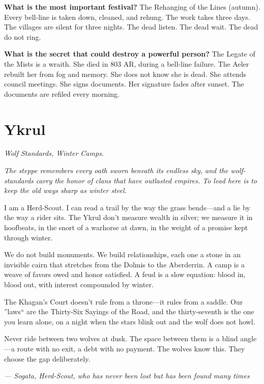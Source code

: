 \begin{almanac}
\textbf{What is the most important festival?} The Rehanging of the Lines (autumn). Every bell-line is taken down, cleaned, and rehung. The work takes three days. The villages are silent for three nights. The dead listen. The dead wait. The dead do not ring.

\textbf{What is the secret that could destroy a powerful person?} The Legate of the Mists is a wraith. She died in 803 AR, during a bell-line failure. The Aeler rebuilt her from fog and memory. She does not know she is dead. She attends council meetings. She signs documents. Her signature fades after sunset. The documents are refiled every morning.
\end{almanac}

\newpage

\newpage

\chapter{Ykrul}
\emph{Wolf Standards, Winter Camps.}

\noindent
{\Large
\textit{The steppe remembers every oath sworn beneath its endless sky, and the wolf-standards carry the honor of clans that have outlasted empires. To lead here is to keep the old ways sharp as winter steel.}

\vspace{0.5em}

I am a Herd-Scout. I can read a trail by the way the grass bends---and a lie by the way a rider sits. The Ykrul don't measure wealth in silver; we measure it in hoofbeats, in the snort of a warhorse at dawn, in the weight of a promise kept through winter.

\vspace{0.5em}

We do not build monuments. We build relationships, each one a stone in an invisible cairn that stretches from the Dolmis to the Aberderrin. A camp is a weave of favors owed and honor satisfied. A feud is a slow equation: blood in, blood out, with interest compounded by winter.

\vspace{0.5em}

The Khagan's Court doesn't rule from a throne---it rules from a saddle. Our ''laws`` are the Thirty-Six Sayings of the Road, and the thirty-seventh is the one you learn alone, on a night when the stars blink out and the wolf does not howl.

\vspace{0.5em}

Never ride between two wolves at dusk. The space between them is a blind angle---a route with no exit, a debt with no payment. The wolves know this. They choose the gap deliberately.

\vspace{1em}

\noindent\textit{--- Sogata, Herd-Scout, who has never been lost but has been found many times}
}

